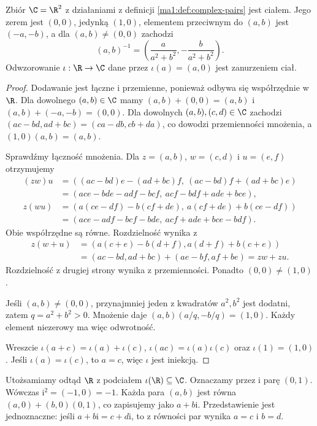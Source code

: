 \begin{twierdzenie}
\label{ma1:thm:complex-field}
Zbiór $\C=\R^2$ z działaniami z definicji \ref{ma1:def:complex-pairs} jest ciałem. Jego zerem jest $(0,0)$, jedynką $(1,0)$, elementem przeciwnym do $(a,b)$ jest $(-a,-b)$, a dla $(a,b)\ne(0,0)$ zachodzi
\[
 (a,b)^{-1}=\left(\frac{a}{a^2+b^2},-\frac{b}{a^2+b^2}\right).
\]
Odwzorowanie $\iota:\R\to\C$ dane przez $\iota(a)=(a,0)$ jest zanurzeniem ciał.
\end{twierdzenie}
\begin{proof}
Dodawanie jest łączne i przemienne, ponieważ odbywa się współrzędnie w $\R$. Dla dowolnego $(a,b)\in\C$ mamy $(a,b)+(0,0)=(a,b)$ i $(a,b)+(-a,-b)=(0,0)$. Dla dowolnych $(a,b),(c,d)\in\C$ zachodzi $(ac-bd,ad+bc)=(ca-db,cb+da)$, co dowodzi przemienności mnożenia, a $(1,0)(a,b)=(a,b)$.

Sprawdźmy łączność mnożenia. Dla $z=(a,b)$, $w=(c,d)$ i $u=(e,f)$ otrzymujemy
\[
\begin{aligned}
 (zw)u
 &=((ac-bd)e-(ad+bc)f,\ (ac-bd)f+(ad+bc)e)\\
 &=(ace-bde-adf-bcf,\ acf-bdf+ade+bce),\\
 z(wu)
 &=(a(ce-df)-b(cf+de),\ a(cf+de)+b(ce-df))\\
 &=(ace-adf-bcf-bde,\ acf+ade+bce-bdf).
\end{aligned}
\]
Obie współrzędne są równe. Rozdzielność wynika z
\[
\begin{aligned}
 z(w+u)&=(a(c+e)-b(d+f),a(d+f)+b(c+e))\\
 &=(ac-bd,ad+bc)+(ae-bf,af+be)=zw+zu.
\end{aligned}
\]
Rozdzielność z drugiej strony wynika z przemienności. Ponadto $(0,0)\ne(1,0)$.

Jeśli $(a,b)\ne(0,0)$, przynajmniej jeden z kwadratów $a^2,b^2$ jest dodatni, zatem $q=a^2+b^2>0$. Mnożenie daje $(a,b)(a/q,-b/q)=(1,0)$. Każdy element niezerowy ma więc odwrotność.

Wreszcie $\iota(a+c)=\iota(a)+\iota(c)$, $\iota(ac)=\iota(a)\iota(c)$ oraz $\iota(1)=(1,0)$. Jeśli $\iota(a)=\iota(c)$, to $a=c$, więc $\iota$ jest iniekcją.
\end{proof}

Utożsamiamy odtąd $\R$ z podciałem $\iota(\R)\subseteq\C$. Oznaczamy przez $\mathrm i$ parę $(0,1)$. Wówczas $\mathrm i^2=(-1,0)=-1$. Każda para $(a,b)$ jest równa $(a,0)+(b,0)(0,1)$, co zapisujemy jako $a+b\mathrm i$. Przedstawienie jest jednoznaczne: jeśli $a+b\mathrm i=c+d\mathrm i$, to z równości par wynika $a=c$ i $b=d$.

